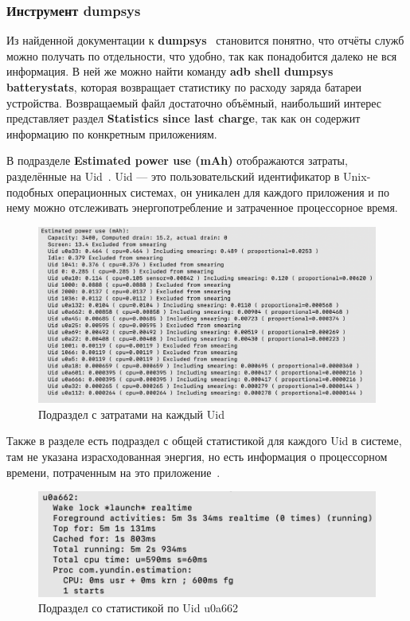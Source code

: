 \documentclass[a4paper,14pt]{extarticle} %
\begin{document}
	\subsubsection{Инструмент dumpsys} \label{subsub:dumpsys}
	
	Из найденной документации к \textbf{dumpsys}~\parencite{Dumpsys} становится понятно, что отчёты служб можно получать по отдельности, что удобно, так как понадобится далеко не вся информация. В ней же можно найти команду \textbf{adb shell dumpsys batterystats}, которая возвращает статистику по расходу заряда батареи устройства. Возвращаемый файл достаточно объёмный, наибольший интерес представляет раздел \textbf{Statistics since last charge}, так как он содержит информацию по конкретным приложениям.
	
	В подразделе \textbf{Estimated power use (mAh)} отображаются затраты, разделённые на Uid~\ris{\ref{fig:estimated_use}}. Uid --- это пользовательский идентификатор в Unix-подобных операционных системах, он уникален для каждого приложения и по нему можно отслеживать энергопотребление и затраченное процессорное время.
	
	\begin{figure}[!htb]
		\includegraphics[width=\textwidth]{estimated_use}
		\caption{Подраздел с затратами на каждый Uid}
		\label{fig:estimated_use}
	\end{figure}
	
	Также в разделе есть подраздел с общей статистикой для каждого Uid в системе, там не указана израсходованная энергия, но есть информация о процессорном времени, потраченным на это приложение~\ris{\ref{fig:uid_subsection}}.

	\begin{figure}[!htb]
		\includegraphics[width=\textwidth]{uid_subsection}
		\caption{Подраздел со статистикой по Uid u0a662}
		\label{fig:uid_subsection}
	\end{figure}
\end{document}
